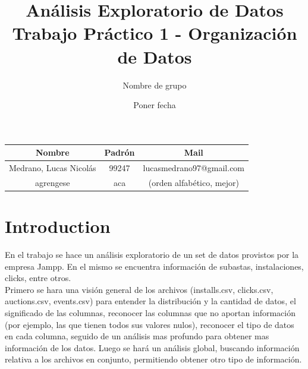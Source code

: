 \documentclass{article}
\title{Análisis Exploratorio de Datos \\ Trabajo Práctico 1 - Organización de Datos}
\author{Nombre de grupo}
\date{Poner fecha}
\newcommand\tab[1][1cm]{\hspace*{#1}}
\begin{document}
\begin{figure}
    \centering
\end{figure}

\maketitle

\FloatBarrier
\begin{center}
        \begin{tabular}{ |c|c|c| }
          \hline
          Nombre & Padrón & Mail \\
          \hline
          Medrano, Lucas Nicolás & 99247 & lucasmedrano97@gmail.com \\
          \hline
          agrengese & aca & (orden alfabético, mejor) \\
          \hline
        \end{tabular}
\end{center}
\FloatBarrier

\newpage

\tableofcontents
\newpage
\section{Introduction}
	\tab En el trabajo se hace un análisis exploratorio de un set de datos provistos por la empresa Jampp. En el mismo se encuentra información de subastas, instalaciones, clicks, entre otros.\\
	\tab Primero se hara una visión general de los archivos (installs.csv, clicks.csv, auctions.csv, events.csv) para entender la distribución y la cantidad de datos, el significado de las columnas, reconocer las columnas que no aportan información (por ejemplo, las que tienen todos sus valores nulos), reconocer el tipo de datos en cada columna, seguido de un análisis mas profundo para obtener mas información de los datos. Luego se hará un análisis global, buscando información relativa a los archivos en conjunto, permitiendo obtener otro tipo de información.
\end{document}
